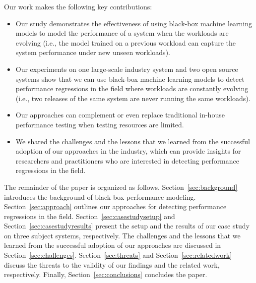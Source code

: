Our work makes the following key contributions:
\begin{itemize} 
    \item Our study demonstrates the effectiveness of using black-box machine learning models to model the performance of a system when the workloads are evolving (i.e., the model trained on a previous workload can capture the system performance under new unseen workloads). %
    \item Our experiments on one large-scale industry system and two open source systems show that we can use black-box machine learning models to detect performance regressions in the field where workloads are constantly evolving (i.e., two releases of the same system are never running the same workloads).
    \item Our approaches can complement or even replace traditional in-house performance testing when testing resources are limited.
    \item We shared the challenges and the lessons that we learned from the successful adoption of our approaches in the industry, which can provide insights for researchers and practitioners who are interested in detecting performance regressions in the field.
\end{itemize}

The remainder of the paper is organized as follows. 
Section~\ref{sec:background} introduces the background of black-box performance modeling.
Section~\ref{sec:approach} outlines our approaches for detecting performance regressions in the field.
Section~\ref{sec:casestudysetup} and Section~\ref{sec:casestudyresults} present the setup and the results of our case study on three subject systems, respectively.
The challenges and the lessons that we learned from the successful adoption of our approaches are discussed in Section~\ref{sec:challenges}.
Section~\ref{sec:threats} and Section~\ref{sec:relatedwork} discuss the threats to the validity of our findings and the related work, respectively.
Finally, Section~\ref{sec:conclusions} concludes the paper.

